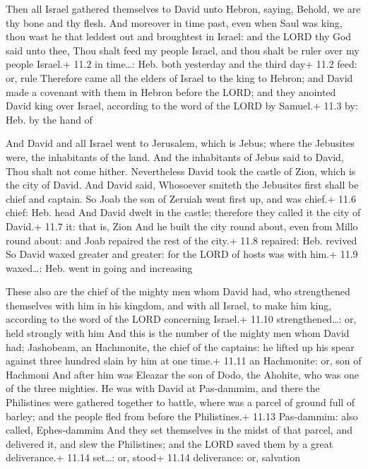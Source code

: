  Then all Israel gathered themselves to David unto Hebron,
saying, Behold, we are thy bone and thy flesh.  And moreover
in time past, even when Saul was king, thou wast he that leddest out and
broughtest in Israel: and the LORD thy God said unto thee, Thou shalt
feed my people Israel, and thou shalt be ruler over my people Israel.+
11.2 in time\ldots: Heb. both yesterday and the third day+ 11.2 feed:
or, rule  Therefore came all the elders of Israel to the
king to Hebron; and David made a covenant with them in Hebron before the
LORD; and they anointed David king over Israel, according to the word of
the LORD by Samuel.+ 11.3 by: Heb. by the hand of

 And David and all Israel went to Jerusalem, which is
Jebus; where the Jebusites were, the inhabitants of the land.
 And the inhabitants of Jebus said to David, Thou shalt not
come hither. Nevertheless David took the castle of Zion, which is the
city of David.  And David said, Whosoever smiteth the
Jebusites first shall be chief and captain. So Joab the son of Zeruiah
went first up, and was chief.+ 11.6 chief: Heb. head  And
David dwelt in the castle; therefore they called it the city of David.+
11.7 it: that is, Zion  And he built the city round about,
even from Millo round about: and Joab repaired the rest of the city.+
11.8 repaired: Heb. revived  So David waxed greater and
greater: for the LORD of hosts was with him.+ 11.9 waxed\ldots: Heb.
went in going and increasing

 These also are the chief of the mighty men whom David
had, who strengthened themselves with him in his kingdom, and with all
Israel, to make him king, according to the word of the LORD concerning
Israel.+ 11.10 strengthened\ldots: or, held strongly with him
 And this is the number of the mighty men whom David had;
Jashobeam, an Hachmonite, the chief of the captains: he lifted up his
spear against three hundred slain by him at one time.+ 11.11 an
Hachmonite: or, son of Hachmoni  And after him was Eleazar
the son of Dodo, the Ahohite, who was one of the three mighties.
 He was with David at Pas-dammim, and there the Philistines
were gathered together to battle, where was a parcel of ground full of
barley; and the people fled from before the Philistines.+ 11.13
Pas-dammim: also called, Ephes-dammim  And they set
themselves in the midst of that parcel, and delivered it, and slew the
Philistines; and the LORD saved them by a great deliverance.+ 11.14
set\ldots: or, stood+ 11.14 deliverance: or, salvation

